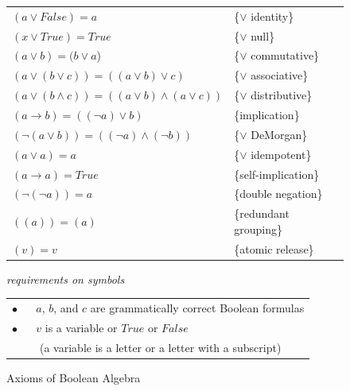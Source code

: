 \begin{figure}
\begin{center}
\begin{tabular}{ll}
$(a \vee False) = a$                                     & \{$\vee$ identity\} \\
$(x \vee True) = True$                                   & \{$\vee$ null\} \\
$(a \vee b) = (b \vee a$)                                & \{$\vee$ commutative\} \\
$(a \vee (b \vee c)) = ((a \vee b) \vee c)$              & \{$\vee$ associative\} \\
$(a \vee (b \wedge c)) = ((a \vee b) \wedge (a \vee c))$ & \{$\vee$ distributive\} \\
$(a \rightarrow b) = ((\neg a) \vee b)$                  & \{implication\} \\
$(\neg(a \vee b)) = ((\neg a) \wedge (\neg b))$          & \{$\vee$ DeMorgan\} \\
$(a \vee a) = a$                                         & \{$\vee$ idempotent\} \\
$(a \rightarrow a) = True$                               & \{self-implication\} \\
$(\neg(\neg a))  = a$                                    & \{double negation\} \\
$((a)) = (a)$                                            & \{redundant grouping\} \\
$(v) = v$                                                & \{atomic release\} \\
\end{tabular}

\vspace{2 mm}

\emph{requirements on symbols}

\begin{tabular}{l}
\hline
$\bullet$ ~~ $a$, $b$, and $c$ are grammatically correct Boolean formulas \\
$\bullet$ ~~ $v$ is a variable or $True$ or $False$ \\
~~~~~(a variable is a letter or a letter with a subscript) \\
\hline
\end{tabular}
\end{center}
\caption{Axioms of Boolean Algebra}
\label{fig-02-boolean-axioms}
\end{figure}

